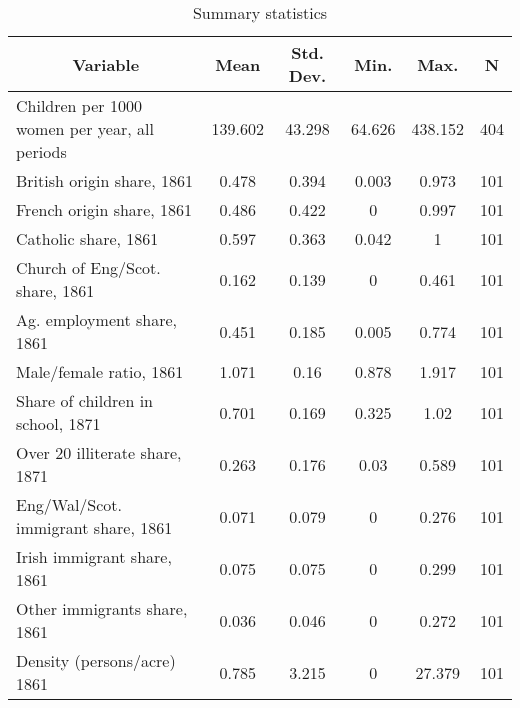 
\begin{table}[htbp]\centering \caption{Summary statistics \label{sumstat}}
\begin{tabular}{l c c c c c}\hline\hline
\multicolumn{1}{c}{\textbf{Variable}} & \textbf{Mean}
 & \textbf{Std. Dev.}& \textbf{Min.} &  \textbf{Max.} & \textbf{N}\\ \hline
Children per 1000 women per year, all periods & 139.602 & 43.298 & 64.626 & 438.152 & 404\\
British origin share, 1861 & 0.478 & 0.394 & 0.003 & 0.973 & 101\\
French origin share, 1861 & 0.486 & 0.422 & 0 & 0.997 & 101\\
Catholic share, 1861 & 0.597 & 0.363 & 0.042 & 1 & 101\\
Church of Eng/Scot. share, 1861 & 0.162 & 0.139 & 0 & 0.461 & 101\\
Ag. employment share, 1861 & 0.451 & 0.185 & 0.005 & 0.774 & 101\\
Male/female ratio, 1861 & 1.071 & 0.16 & 0.878 & 1.917 & 101\\
Share of children in school, 1871 & 0.701 & 0.169 & 0.325 & 1.02 & 101\\
Over 20 illiterate share, 1871 & 0.263 & 0.176 & 0.03 & 0.589 & 101\\
Eng/Wal/Scot. immigrant share, 1861 & 0.071 & 0.079 & 0 & 0.276 & 101\\
Irish immigrant share, 1861 & 0.075 & 0.075 & 0 & 0.299 & 101\\
Other immigrants share, 1861 & 0.036 & 0.046 & 0 & 0.272 & 101\\
Density (persons/acre) 1861 & 0.785 & 3.215 & 0 & 27.379 & 101\\
\hline\end{tabular}
\end{table}
